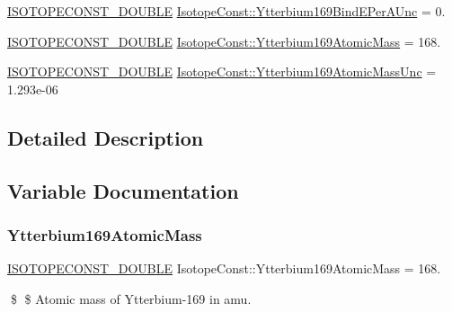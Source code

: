 \begin{DoxyCompactItemize}
\mbox{\hyperlink{group___isotope_const-_macros_ga8f45a7272ce02c0b4c65c44636ed719a}{I\+S\+O\+T\+O\+P\+E\+C\+O\+N\+S\+T\+\_\+\+D\+O\+U\+B\+LE}} \mbox{\hyperlink{group___isotope_const-_ytterbium-_yb169_ga8f2dca6d5d6a80e7a131921914a21488}{Isotope\+Const\+::\+Ytterbium169\+Bind\+E\+Per\+A\+Unc}} = 0.
\item 
\mbox{\hyperlink{group___isotope_const-_macros_ga8f45a7272ce02c0b4c65c44636ed719a}{I\+S\+O\+T\+O\+P\+E\+C\+O\+N\+S\+T\+\_\+\+D\+O\+U\+B\+LE}} \mbox{\hyperlink{group___isotope_const-_ytterbium-_yb169_ga858729c9613a2f4af61879bb141a9f5a}{Isotope\+Const\+::\+Ytterbium169\+Atomic\+Mass}} = 168.
\item 
\mbox{\hyperlink{group___isotope_const-_macros_ga8f45a7272ce02c0b4c65c44636ed719a}{I\+S\+O\+T\+O\+P\+E\+C\+O\+N\+S\+T\+\_\+\+D\+O\+U\+B\+LE}} \mbox{\hyperlink{group___isotope_const-_ytterbium-_yb169_ga0715c06c1254dd7e70651d971fdb3363}{Isotope\+Const\+::\+Ytterbium169\+Atomic\+Mass\+Unc}} = 1.\+293e-\/06
\end{DoxyCompactItemize}


\subsection{Detailed Description}


\subsection{Variable Documentation}
\mbox{\label{group___isotope_const-_ytterbium-_yb169_ga858729c9613a2f4af61879bb141a9f5a}} 
\subsubsection{\texorpdfstring{Ytterbium169\+Atomic\+Mass}{Ytterbium169AtomicMass}}
{\footnotesize\ttfamily \mbox{\hyperlink{group___isotope_const-_macros_ga8f45a7272ce02c0b4c65c44636ed719a}{I\+S\+O\+T\+O\+P\+E\+C\+O\+N\+S\+T\+\_\+\+D\+O\+U\+B\+LE}} Isotope\+Const\+::\+Ytterbium169\+Atomic\+Mass = 168.}

\$ \$ Atomic mass of Ytterbium-\/169 in amu. \mbox{\label{group___isotope_const-_ytterbium-_yb169_ga0715c06c1254dd7e70651d971fdb3363}} 
